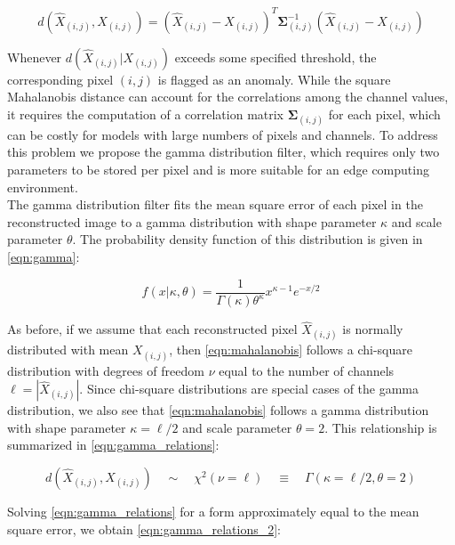 \documentclass[12pt]{article}
\begin{document}
\begin{equation}
d(\hat{X}_{(i,j)}, X_{(i,j)}) = (\hat{X}_{(i,j)} - X_{(i,j)})^T\mathbf{\Sigma}^{-1}_{(i,j)}(\hat{X}_{(i,j)} - X_{(i,j)})
\label{eqn:mahalanobis}
\end{equation}

Whenever $d(\hat{X}_{(i,j)} | X_{(i,j)})$ exceeds some specified threshold, the corresponding pixel $(i,j)$ is flagged as an anomaly. While the square Mahalanobis distance can account for the correlations among the channel values, it requires the computation of a correlation matrix $\mathbf{\Sigma}_{(i,j)}$ for each pixel, which can be costly for models with large numbers of pixels and channels. To address this problem we propose the gamma distribution filter, which requires only two parameters to be stored per pixel and is more suitable for an edge computing environment.\\

The gamma distribution filter fits the mean square error of each pixel in the reconstructed image to a gamma distribution with shape parameter $\kappa$ and scale parameter $\theta$. The probability density function of this distribution is given in \eqref{eqn:gamma}:

\begin{equation}
f(x|\kappa,\theta) = \frac{1}{\Gamma(\kappa)\theta^\kappa}x^{\kappa - 1}e^{-x / 2}
\label{eqn:gamma}
\end{equation}

As before, if we assume that each reconstructed pixel $\hat{X}_{(i,j)}$ is normally distributed with mean $X_{(i,j)}$, then \eqref{eqn:mahalanobis} follows a chi-square distribution with degrees of freedom $\nu$ equal to the number of channels $\ell = |\hat{X}_{(i,j)}|$. Since chi-square distributions are special cases of the gamma distribution, we also see that \eqref{eqn:mahalanobis} follows a gamma distribution with shape parameter $\kappa = \ell/2$ and scale parameter $\theta = 2$. This relationship is summarized in \eqref{eqn:gamma_relations}:

\begin{equation}
d(\hat{X}_{(i,j)}, X_{(i,j)})\quad \sim\quad \chi^{2}(\nu = \ell)\quad \equiv \quad \Gamma(\kappa = \ell/2, \theta = 2)
\label{eqn:gamma_relations}
\end{equation}

\noindent Solving \eqref{eqn:gamma_relations} for a form approximately equal to the mean square error, we obtain \eqref{eqn:gamma_relations_2}:
\end{document}
